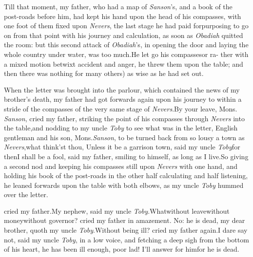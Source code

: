 \documentclass{article}
\begin{document}
Till that moment, my father, who
had a map of \textit{Sanson}’s, and a book of the
post-roads before him, had kept his hand 
upon the head of his compasses, with one
foot of them fixed upon \textit{Nevers}, the last
stage he had paid for\tsk purposing to go
on from that point with his journey and
calculation, as soon as \textit{Obadiah} quitted
the room: but this second attack of \textit{Oba\-diah}’s,
in opening the door and laying 
the whole country under water, was too
much.\tsh He let go his compasses\tsk or ra- ther with
a mixed motion betwixt accident and anger, he threw them upon the table; and
then there was nothing for\break
{}
many others) as wise as he had set out.

When the letter was brought into the parlour, which contained
the news of my brother’s death, my father had got forwards
again upon his journey to within a stride of the compasses of the
very same stage of \textit{Nevers}.\tsh By your leave,
Mons.\@
\textit{Sanson}, cried my father, striking the point of his compasses
through \textit{Nevers} into the table,\tsk and nodding to my uncle
\textit{Toby} to see what was in the letter,\break
{}\break
English
gentleman and his son, Mons.\@ \textit{Sanson}, to be turned
back from so lousy a town as \textit{Nevers},\tsk what
think’st thou,\break
{}
\tsk Unless it be a garrison town, said my uncle
\textit{Toby}\tsk for then\tsk I shall be a fool,
said my father, smiling to himself, as\break
long as I live.\tsk So giving a second nod\break
\tsk and keeping his compasses still upon
\textit{Nevers} with one hand, and holding his book of the
post-roads in the other\tsk\break
half calculating and half listening, he\break
leaned forwards upon the table with both\break
elbows, as my uncle \textit{Toby} hummed over\break
the letter.

\baselineskip

\noindent\etp
\stick{\indent\tsh\quad\tsh\quad\tsh\quad\tsh\quad\tsh}
\stick{\tsh\quad\tsh\quad\tsk\quad\tsh\quad\tsh\quad\tsh}
\stick{\tsk\quad\tsh\quad\tsk\quad\tsk\quad\tsh\quad\tsk\quad\tsk}
cried my father.\tsk My nephew, said my uncle
\textit{Toby}.\tsk\tsk What\tsk without leave\tsk without
money\tsh without governor?\break
cried my father in amazement. No:\tsk\break
he is dead, my dear brother, quoth my uncle
\textit{Toby}.\tsk Without being ill?  cried my father
again.\tsk I dare say not, said my uncle \textit{Toby}, in a
low voice, and fetching a deep sigh from the bottom of
his heart, he has been ill enough, poor lad! I’ll answer
for him\tsk for he is dead.
\end{document}
